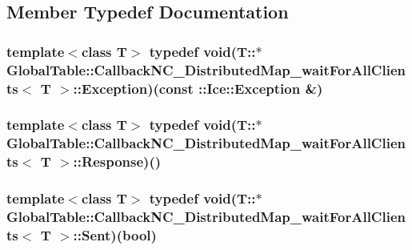 \subsection{Member Typedef Documentation}
\hypertarget{class_global_table_1_1_callback_n_c___distributed_map__wait_for_all_clients_a839e50155924aac25bbf989dadbc8275}{
\subsubsection[{Exception}]{\setlength{\rightskip}{0pt plus 5cm}template$<$class T$>$ typedef void(T::$\ast$ {\bf GlobalTable::CallbackNC\_\-DistributedMap\_\-waitForAllClients}$<$ T $>$::{\bf Exception})(const ::Ice::Exception \&)}}
\label{class_global_table_1_1_callback_n_c___distributed_map__wait_for_all_clients_a839e50155924aac25bbf989dadbc8275}
\hypertarget{class_global_table_1_1_callback_n_c___distributed_map__wait_for_all_clients_a86f9430f8e3319d74484f2c3678c36bd}{
\subsubsection[{Response}]{\setlength{\rightskip}{0pt plus 5cm}template$<$class T$>$ typedef void(T::$\ast$ {\bf GlobalTable::CallbackNC\_\-DistributedMap\_\-waitForAllClients}$<$ T $>$::{\bf Response})()}}
\label{class_global_table_1_1_callback_n_c___distributed_map__wait_for_all_clients_a86f9430f8e3319d74484f2c3678c36bd}
\hypertarget{class_global_table_1_1_callback_n_c___distributed_map__wait_for_all_clients_a3ee9a892cbd5431e6d2cd0c48336f315}{
\subsubsection[{Sent}]{\setlength{\rightskip}{0pt plus 5cm}template$<$class T$>$ typedef void(T::$\ast$ {\bf GlobalTable::CallbackNC\_\-DistributedMap\_\-waitForAllClients}$<$ T $>$::{\bf Sent})(bool)}}
